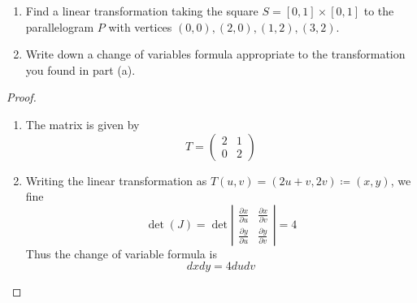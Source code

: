 \documentclass[openany]{book}
\begin{document}
\begin{prob}[1]
    \begin{enumerate}
        \item[(a)]  Find a linear transformation taking the square \( S = [0, 1] \times [0, 1] \) to the parallelogram \( P \) with vertices \((0, 0), (2, 0), (1, 2), (3, 2)\).  
        \item[(b)]  Write down a change of variables formula appropriate to the transformation you found in part (a).
    \end{enumerate}
\end{prob}
\begin{proof}
    \begin{enumerate}
        \item[(a)]  The matrix is given by 
        \begin{equation*}
            T=\begin{pmatrix}
                2&1\\
                0&2
            \end{pmatrix}
        \end{equation*}
        \item[(b)] Writing the linear transformation as $T(u,v)=(2u+v, 2v)\coloneq(x,y)$, we fine 
        \begin{equation*}
            \det(J)=\det\left|\begin{matrix}
                \frac{\partial x}{\partial u}&\frac{\partial x}{\partial v}\\
                \frac{\partial y}{\partial u}&\frac{\partial y}{\partial v}
            \end{matrix}\right|=4
        \end{equation*}
        Thus the change of variable formula is 
        \begin{equation*}
            dxdy=4dudv
        \end{equation*}
    \end{enumerate}
\end{proof}
\end{document}
